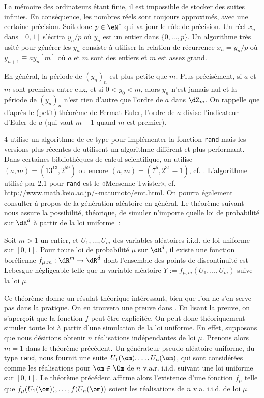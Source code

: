 La mémoire des ordinateurs étant finie, il est impossible de stocker des
suites infinies. En conséquence, les nombres réels sont toujours approximés,
avec une certaine précision. Soit donc $p\in\eN^*$ qui va jour le rôle de
précision. Un réel $x_n$ dans $[0,1]$ s'écrira $y_n/p$ où $y_n$ est un entier
dans $\{0,\ldots,p\}$. Un algorithme très usité pour générer les $y_n$
consiste à utiliser la relation de récurrence $x_n=y_n/p$ où $y_{n+1}\equiv a
y_n [m]$ où $a$ et $m$ sont des entiers et $m$ est assez grand.

En général, la période de $(y_n)_n$ est plus petite que $m$. Plus précisément,
si $a$ et $m$ sont premiers entre eux, et si $0<y_0<m$, alors $y_n$ n'est
jamais nul et la période de $(y_n)_n$ n'est rien d'autre que l'ordre de $a$
dans $\dZ_m$. On rappelle que d'après le (petit) théorème de Fermat-Euler,
l'ordre de $a$ divise l'indicateur d'Euler de $a$ (qui vaut $m-1$ quand $m$
est premier).

\ML{} 4 utilise un algorithme de ce type pour implémenter la fonction
\texttt{rand} mais les versions plus récentes de \ML{} utilisent un algorithme
différent et plus performant. Dans certaines bibliothèques de calcul
scientifique, on utilise $(a,m)=(13^{13},2^{59})$ ou encore
$(a,m)=(7^5,2^{31}-1)$, cf. \cite[page 74]{bouleau}.  L'algorithme utilisé par
\OC{} 2.1 pour \texttt{rand} est le «Mersenne Twister», cf.
\url{http://www.math.keio.ac.jp/~matumoto/emt.html}.  On pourra également
consulter \cite{knuth-taocp-2-3} à propos de la génération aléatoire en
général. Le théorème suivant nous assure la possibilité, théorique, de simuler
n'importe quelle loi de probabilité sur $\dR^d$ à partir de la loi uniforme~:

\begin{thm}
  Soit $m>1$ un entier, et $U_1,\ldots,U_m$ des variables aléatoires i.i.d. de loi
  uniforme sur $[0,1]$. Pour toute loi de probabilité $\mu$ sur $\dR^d$, il
  existe une fonction borélienne $f_{\mu,m}:\dR^m\to\dR^d$ dont l'ensemble des
  points de discontinuité est Lebesgue-négligeable telle que la variable
  aléatoire $Y:=f_{\mu,m}(U_1,\ldots,U_m)$ suive la loi $\mu$.
\end{thm}

Ce théorème donne un résulat théorique intéressant, bien que l'on ne s'en
serve pas dans la pratique. On en trouvera une preuve dans \cite[chap. X page
267]{bouleau}. En lisant la preuve, on s'aperçoit que la fonction $f$ peut
être explicitée. On peut donc théoriquement simuler toute loi à partir d'une
simulation de la loi uniforme. En effet, supposons que nous désirions obtenir
$n$ réalisations indépendantes de loi $\mu$. Prenons alors $m=1$ dans le
théorème précédent. Un générateur pseudo-aléatoire uniforme, du type
\texttt{rand}, nous fournit une suite $U_1(\om),\ldots,U_n(\om)$, qui sont
considérées comme les réalisations pour $\om\in\Om$ de $n$ v.a.r. i.i.d. suivant
une loi uniforme sur $[0,1]$. Le théorème précédent affirme alors l'existence
d'une fonction $f_\mu$ telle que $f_\mu(U_1(\om)),\ldots,f(U_n(\om))$ soient les
réalisations de $n$ v.a. i.i.d. de loi $\mu$.


